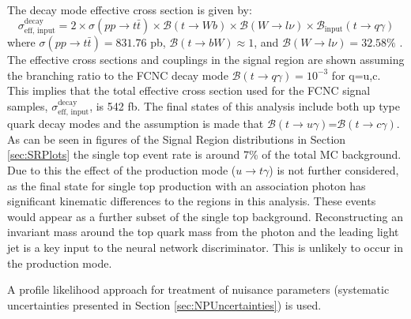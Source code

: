 The decay mode effective cross section is given by:
\[\sigma_\text{eff, input}^\text{decay} = 2\times \sigma(pp\rightarrow t\bar{t}) \times \mathcal{B}(t\rightarrow Wb) \times \mathcal{B}(W\rightarrow l \nu)\times \mathcal{B}_\text{input}(t \rightarrow q \gamma)
\]
where $\sigma(pp\rightarrow t\bar{t}) =831.76$ pb, $\mathcal{B}(t\rightarrow bW) \approx1$, and $\mathcal{B}(W\rightarrow l \nu) =32.58\%$ .  The effective cross sections and couplings in the signal region are shown assuming the branching ratio to the FCNC decay mode $\mathcal{B}(t\rightarrow q \gamma) = 10^{-3}$ for q=u,c.  This implies that the total effective cross section used for the FCNC signal samples, $\sigma_\text{eff, input}^\text{decay}$, is 542 fb.  The final states of this analysis include both up type quark decay modes and the assumption is made that $\mathcal{B}(t\rightarrow u\gamma)$=$\mathcal{B}(t\rightarrow c\gamma)$.  As can be seen in figures of the Signal Region distributions in Section \ref{sec:SRPlots} the single top event rate is around 7\% of the total MC background.  Due to this the effect of the production mode ($u\rightarrow t\gamma$) is not further considered, as the final state for single top production with an association photon has significant kinematic differences to the regions in this analysis.  These events would appear as a further subset of the single top background.  Reconstructing an invariant mass around the top quark mass from the photon and the leading light jet is a key input to the neural network discriminator.  This is unlikely to occur in the production mode.

A profile likelihood approach for treatment of nuisance parameters\cite{Cowan:2010js} (systematic uncertainties presented in Section \ref{sec:NPUncertainties}) is used.

